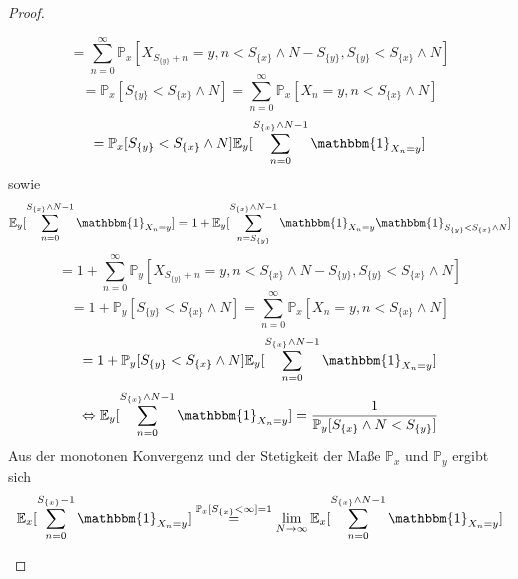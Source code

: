 \documentclass[a4paper,12pt]{scrartcl}
\theoremstyle{definition}
\begin{document}
\begin{proof}
\begin{itemize}
\begin{equation*}
= \sum_{n=0}^{\infty} \mathbb{P}_{x}[X_{S_{\lbrace y \rbrace} + n}=y,n<S_{\lbrace x \rbrace} \wedge N - S_{\lbrace y \rbrace}, S_{\lbrace y \rbrace} < S_{\lbrace x \rbrace} \wedge N]
\end{equation*}
\begin{equation*}
= \mathbb{P}_{x}[S_{\lbrace y \rbrace} < S_{\lbrace x \rbrace} \wedge N]= \sum_{n=0}^{\infty} \mathbb{P}_{x}[X_{n}=y,n<S_{\lbrace x \rbrace} \wedge N]
\end{equation*}
\begin{equation*}
= \mathbb{P}_{x}[S_{\lbrace y \rbrace} < S_{\lbrace x \rbrace} \wedge N]\mathbb{E}_{y}[\sum_{n=0}^{S_{\lbrace x \rbrace} \wedge N -1}  \mathbbm{1}_{X_{n} = y}]
\end{equation*}
sowie
\begin{equation*}
\mathbb{E}_{y}[\sum_{n=0}^{S_{\lbrace x \rbrace} \wedge N -1}  \mathbbm{1}_{X_{n} = y}] = 1 + \mathbb{E}_{y}[\sum_{n=S_{\lbrace y \rbrace}}^{S_{\lbrace x \rbrace} \wedge N -1}  \mathbbm{1}_{X_{n} = y} \mathbbm{1}_{S_{\lbrace y \rbrace} < S_{\lbrace x \rbrace} \wedge N}]
\end{equation*}
\begin{equation*}
= 1 + \sum_{n=0}^{\infty} \mathbb{P}_{y}[X_{S_{\lbrace y \rbrace} + n}=y,n<S_{\lbrace x \rbrace} \wedge N - S_{\lbrace y \rbrace}, S_{\lbrace y \rbrace} < S_{\lbrace x \rbrace} \wedge N]
\end{equation*}
\begin{equation*}
= 1 + \mathbb{P}_{y}[S_{\lbrace y \rbrace} < S_{\lbrace x \rbrace} \wedge N]= \sum_{n=0}^{\infty} \mathbb{P}_{x}[X_{n}=y,n<S_{\lbrace x \rbrace} \wedge N]
\end{equation*}
\begin{equation*}
= 1 + \mathbb{P}_{y}[S_{\lbrace y \rbrace} < S_{\lbrace x \rbrace} \wedge N]\mathbb{E}_{y}[\sum_{n=0}^{S_{\lbrace x \rbrace} \wedge N -1}  \mathbbm{1}_{X_{n} = y}]
\end{equation*}
\begin{equation*}
\Leftrightarrow \mathbb{E}_{y}[\sum_{n=0}^{S_{\lbrace x \rbrace} \wedge N -1}  \mathbbm{1}_{X_{n} = y}] = \dfrac{1}{ \mathbb{P}_{y}[S_{\lbrace x \rbrace} \wedge N < S_{\lbrace y \rbrace}]}
\end{equation*}
Aus der monotonen Konvergenz und der Stetigkeit der Maße $\mathbb{P}_{x}$ und $\mathbb{P}_{y}$ ergibt sich
\begin{equation*}
\mathbb{E}_{x}[\sum_{n=0}^{S_{\lbrace x \rbrace} -1}  \mathbbm{1}_{X_{n} = y}] \stackrel{\mathbb{P}_{x}[S_{\lbrace x \rbrace} < \infty]=1}{=} \lim_{N \to \infty} \mathbb{E}_{x}[\sum_{n=0}^{S_{\lbrace x \rbrace} \wedge N -1}  \mathbbm{1}_{X_{n} = y}]

\end{equation*}
\end{itemize}
\end{proof}
\end{document}

